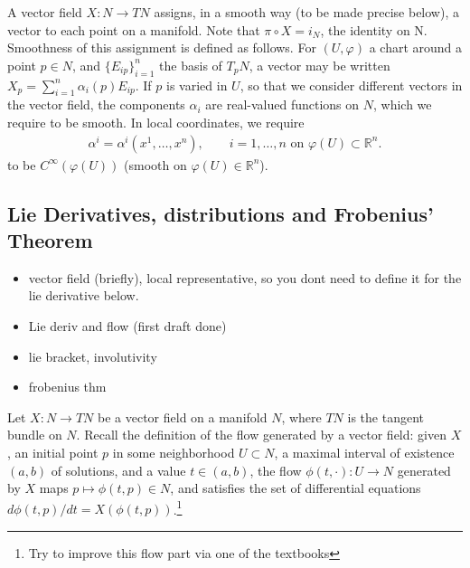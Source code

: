 \documentclass[psamsfonts]{amsart}
\theoremstyle{definition}
\theoremstyle{remark}
\newcommand*\R{\mathds{R}}
\numberwithin{equation}{section}
\begin{document}
A vector field $X: N \rightarrow TN$ assigns, in a smooth way (to be made precise below), a vector to each point on a manifold. Note that $\pi \circ X = i_N$, the identity on N. Smoothness of this assignment is defined as follows. For $(U, \varphi)$ a chart around a point $p\in N$, and $\{E_{ip}\}_{i = 1}^n$ the basis of $T_pN$, a vector may be written $X_p = \sum_{i = 1}^n \alpha_i(p) E_{ip}$. If $p$ is varied in $U$, so that we consider different vectors in the vector field, the components $\alpha_i$ are real-valued functions on $N$, which we require to be smooth. In local coordinates, we require 
\begin{equation}\label{eq:vectorfieldcoeff}
\begin{aligned}
\alpha^i = \alpha^i(x^1, \dots, x^n), \qquad i = 1, \dots, n \text{ on } \varphi(U)\subset \R^n. 
\end{aligned}
\end{equation} 
to be $C^{\infty}(\varphi(U))$ (smooth on $\varphi(U)\in \R^n$). 
\subsection{Lie Derivatives, distributions and Frobenius' Theorem}\label{sec:prelim-frobenius}


{\color{red}
\begin{itemize}
    \item vector field (briefly), local representative, so you dont need to define it for the lie derivative below. 
    \item Lie deriv and flow (first draft done)
    \item lie bracket, involutivity
    \item frobenius thm
\end{itemize}}

Let $X: N \rightarrow TN$ be a vector field on a manifold $N$, where $TN$ is the tangent bundle on $N$. Recall the definition of the flow
generated by a vector field: given $X$, an initial point $p$ in some neighborhood $U\subset N$, a maximal interval of existence $(a, b)$ of solutions, and a value $t\in (a,b)$, the flow $\phi(t, \cdot): U \rightarrow N$ generated by $X$ maps $p \mapsto \phi(t, p)\in N$, and satisfies the set of differential equations $d\phi(t, p)/dt = X(\phi(t, p))$.\footnote{{\color{red} Try to improve this flow part via one of the textbooks}}
\end{document}

